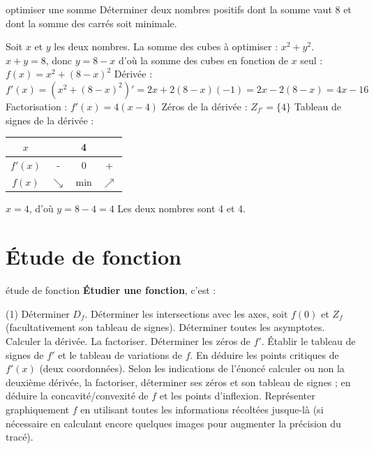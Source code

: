 \documentclass[a4paper,12pt]{article}
\begin{document}
\begin{exemple}
	optimiser une somme
	\tcblower
Déterminer deux nombres positifs dont la somme vaut $8$ et dont la somme des carrés soit minimale.
\begin{tasks}
\task Soit $x$ et $y$ les deux nombres.
\task La somme des cubes à optimiser : $x^2 + y^2$.
\task $x + y = 8$, donc $y = 8 - x$
\task d'où la somme des cubes en fonction de $x$ seul : $f(x) = x^2 + (8 - x)^2$ 
\task  Dérivée : $f'(x) = (x^2 + (8 - x)^2)' = 2x + 2(8 - x)(-1) = 2x - 2(8 - x) = 4x - 16$
\task Factorisation : $f'(x) = 4(x - 4)$
\task Zéros de la dérivée : $Z_{f'} = \{4\}$
\task Tableau de signes de la dérivée :
\begin{center}
\begin{tabular}{|c|c|c|c|}
\hline
$x$ & & 4 & \\
\hline
$f'(x)$ & - & 0 & + \\
\hline
$f(x)$ & $\searrow$ & min & $\nearrow$ \\
\hline
\end{tabular}
\end{center}
\task  $x = 4$, d'où $y = 8 - 4 = 4$
\task Les deux nombres sont 4 et 4.
\end{tasks}
\end{exemple}

\section{Étude de fonction}

\label{sec:etude}
\begin{methode}
	étude de fonction
	\tcblower
\textbf{Étudier une fonction}, c'est :
\begin{tasks}(1)
\task Déterminer $D_f$.
\task Déterminer les intersections avec les axes, soit $f(0)$ et $Z_f$ (facultativement son tableau de signes).
\task Déterminer toutes les asymptotes.
\task Calculer la dérivée.
\task La factoriser.
\task Déterminer les zéros de $f'$.
\task Établir le tableau de signes de $f'$ et le tableau de variations de $f$.
\task En déduire les points critiques de $f'(x)$ (deux coordonnées).
\task * Selon les indications de l'énoncé calculer ou non la deuxième dérivée, la factoriser, déterminer ses zéros et son tableau de signes ; en déduire la concavité/convexité de $f$ et les points d'inflexion.
\task Représenter graphiquement $f$ en utilisant toutes les informations récoltées jusque-là (si nécessaire en calculant encore quelques images pour augmenter la précision du tracé).
\end{tasks}
\end{methode}
\end{document}
